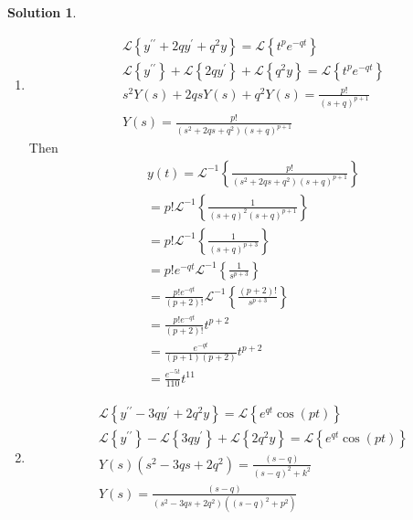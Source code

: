 \documentclass[10pt]{article}
\theoremstyle{definition}
\newtheorem{soln}{Solution}
\newcommand{\laplace}[1]{\mathcal{L}\left\{#1\right\}}
\newcommand{\laplacei}[1]{\mathcal{L}^{-1}\left\{#1\right\}}
\begin{document}
\begin{soln}~
  \begin{enumerate}[label=(\alph*)]
    \item
          \begin{align*}
             & \laplace{y^{\prime\prime}+2qy^\prime+q^2y}=\laplace{t^pe^{-qt}}                     \\
             & \laplace{y^{\prime\prime}}+\laplace{2qy^\prime}+\laplace{q^2y}=\laplace{t^pe^{-qt}} \\
             & s^2Y(s)+2qsY(s)+q^2Y(s)=\frac{p!}{\left(s+q\right)^{p+1}}                           \\
             & Y(s)=\frac{p!}{\left(s^2+2qs+q^2\right)\left(s+q\right)^{p+1}}
          \end{align*}
          Then
          \begin{align*}
             & y(t)=\laplacei{\frac{p!}{\left(s^2+2qs+q^2\right)\left(s+q\right)^{p+1}}}        \\
             & =p!\laplacei{\frac{1}{\left(s+q\right)^2\left(s+q\right)^{p+1}}}                 \\
             & =p!\laplacei{\frac{1}{\left(s+q\right)^{p+3}}}                                   \\
             & =p!e^{-qt}\laplacei{\frac{1}{s^{p+3}}}                                           \\
             & =\frac{p!e^{-qt}}{\left(p+2\right)!}\laplacei{\frac{\left(p+2\right)!}{s^{p+3}}} \\
             & =\frac{p!e^{-qt}}{\left(p+2\right)!}t^{p+2}                                      \\
             & =\frac{e^{-qt}}{\left(p+1\right)\left(p+2\right)}t^{p+2}                         \\
             & =\frac{e^{-5t}}{110}t^{11}
          \end{align*}
    \item
          \begin{align*}
             & \laplace{y^{\prime\prime}-3qy^\prime+2q^2y}=\laplace{e^{qt}\cos\left(pt\right)}                     \\
             & \laplace{y^{\prime\prime}}-\laplace{3qy^\prime}+\laplace{2q^2y}=\laplace{e^{qt}\cos\left(pt\right)} \\
             & Y(s)\left(s^2-3qs+2q^2\right)=\frac{\left(s-q\right)}{\left(s-q\right)^2+k^2}                       \\
             & Y(s)=\frac{\left(s-q\right)}{\left(s^2-3qs+2q^2\right)\left(\left(s-q\right)^2+p^2\right)}

\end{align*}
\end{enumerate}
\end{soln}
\end{document}
